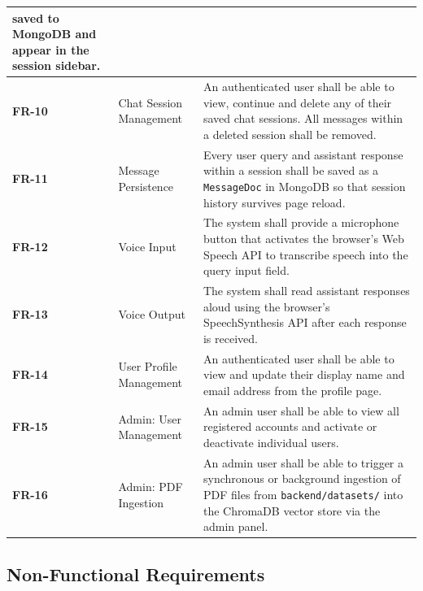 \begin{longtable}{|>{\bfseries\color{navyblue}\centering}p{1.3cm}|p{4.2cm}|p{7.8cm}|}
  saved to MongoDB and appear in the session sidebar. \\
\hline
FR-10 & Chat Session Management &
  An authenticated user shall be able to view, continue and delete any of their saved
  chat sessions. All messages within a deleted session shall be removed. \\
\hline
FR-11 & Message Persistence &
  Every user query and assistant response within a session shall be saved as a
  \texttt{MessageDoc} in MongoDB so that session history survives page reload. \\
\hline
FR-12 & Voice Input &
  The system shall provide a microphone button that activates the browser's Web Speech
  API to transcribe speech into the query input field. \\
\hline
FR-13 & Voice Output &
  The system shall read assistant responses aloud using the browser's SpeechSynthesis API
  after each response is received. \\
\hline
FR-14 & User Profile Management &
  An authenticated user shall be able to view and update their display name and email
  address from the profile page. \\
\hline
FR-15 & Admin: User Management &
  An admin user shall be able to view all registered accounts and activate or deactivate
  individual users. \\
\hline
FR-16 & Admin: PDF Ingestion &
  An admin user shall be able to trigger a synchronous or background ingestion of PDF
  files from \texttt{backend/datasets/} into the ChromaDB vector store via the admin
  panel. \\
\hline
\end{longtable}

\subsection{Non-Functional Requirements}

